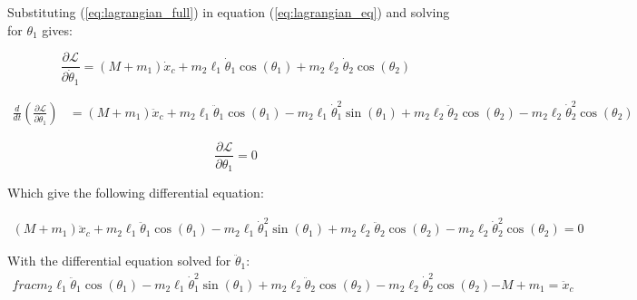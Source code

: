\documentclass[10pt]{article}
\begin{document}
    Substituting (\ref{eq:lagrangian_full}) in equation (\ref{eq:lagrangian_eq}) and solving for $\theta_1$ gives:

    \begin{equation} \label{eq: lagrange Step1}
        \frac{\partial \mathcal{L}}{\partial \dot\theta_1} = (M + m_1)\dot x_c + m_2\ell_1\dot\theta_1\cos(\theta_1) + m_2\ell_2\dot\theta_2\cos(\theta_2)
    \end{equation}

    \begin{equation} \label{eq: lagrange Step2}
        \begin{aligned}
        \frac{d}{dt} \left(\frac{\partial \mathcal{L}}{\partial \dot\theta_1}\right) &= (M + m_1)\ddot x_c + m_2\ell_1\ddot\theta_1\cos(\theta_1) - m_2\ell_1\dot\theta_1^2\sin(\theta_1) + m_2\ell_2\ddot\theta_2\cos(\theta_2) - m_2\ell_2\dot\theta_2^2\cos(\theta_2)
        \end{aligned}
    \end{equation}

    
    \begin{equation} \label{eq: lagrange Step3}
        \frac{\partial \mathcal{L}}{\partial\theta_1} = 0
        \end{equation}

    Which give the following differential equation:

    \begin{equation}
        \begin{aligned}
            (M + m_1)\ddot x_c + m_2\ell_1\ddot\theta_1\cos(\theta_1) - m_2\ell_1\dot\theta_1^2\sin(\theta_1) + m_2\ell_2\ddot\theta_2\cos(\theta_2) - m_2\ell_2\dot\theta_2^2\cos(\theta_2) = 0
        \end{aligned}
    \end{equation}   

    With the differential equation solved for $\ddot \theta_1$:
    \begin{equation}
        \begin{aligned}
            frac{m_2\ell_1\ddot\theta_1\cos(\theta_1) - m_2\ell_1\dot\theta_1^2\sin(\theta_1) + m_2\ell_2\ddot\theta_2\cos(\theta_2) - m_2\ell_2\dot\theta_2^2\cos(\theta_2)}{-M+m_1} = \ddot x_c
        \end{aligned}
    \end{equation}  
\end{document}
